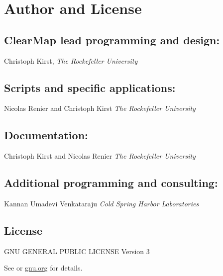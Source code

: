\documentclass[letterpaper,10pt,english]{sphinxmanual}
\begin{document}
\chapter{Author and License}
\label{index:author-and-license}

\section{ClearMap lead programming and design:}
\label{index:clearmap-lead-programming-and-design}
Christoph Kirst,
\emph{The Rockefeller University}


\section{Scripts and specific applications:}
\label{index:scripts-and-specific-applications}
Nicolas Renier and Christoph Kirst
\emph{The Rockefeller University}


\section{Documentation:}
\label{index:documentation}
Christoph Kirst and Nicolas Renier
\emph{The Rockefeller University}


\section{Additional programming and consulting:}
\label{index:additional-programming-and-consulting}
Kannan Umadevi Venkataraju
\emph{Cold Spring Harbor Laboratories}


\section{License}
\label{index:license}
GNU GENERAL PUBLIC LICENSE Version 3

See  or \href{http://www.gnu.org/licenses/gpl-3.0.en.html}{gnu.org} for details.
\end{document}
